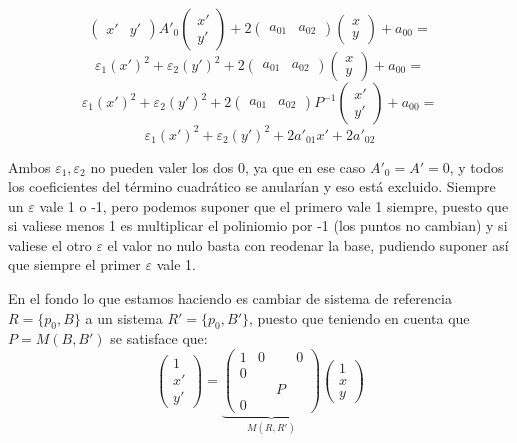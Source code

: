 \documentclass[10pt,a4paper,openright]{book}
\theoremstyle{break}
\begin{document}
$$\begin{pmatrix}
x' & y'
\end{pmatrix} A'_0 \begin{pmatrix}
x' \\ y'
\end{pmatrix} + 2 \begin{pmatrix}
a_{01} & a_{02} \end{pmatrix} \begin{pmatrix}
x \\ y
\end{pmatrix} + a_{00} =$$
$$\varepsilon_1 (x')^2 + \varepsilon_2 (y')^2 + 2 \begin{pmatrix}
a_{01} & a_{02} \end{pmatrix} \begin{pmatrix}
x \\ y
\end{pmatrix} + a_{00} =$$
$$ \varepsilon_1 (x')^2 + \varepsilon_2 (y')^2 + 2 \begin{pmatrix}
a_{01} & a_{02} \end{pmatrix} P^{-1} \begin{pmatrix}
x' \\ y'
\end{pmatrix} + a_{00} = $$
$$\varepsilon_1 (x')^2 + \varepsilon_2 (y')^2 + 2 a'_{01} x' + 2  a'_{02}$$

Ambos $\varepsilon_1 , \varepsilon_2$ no pueden valer los dos 0, ya que en ese caso $A'_0 = A'= 0$, y todos los coeficientes del término cuadrático se anularían y eso está excluido. Siempre un $\varepsilon$ vale 1 o -1, pero podemos suponer que el primero vale 1 siempre, puesto que si valiese menos 1 es multiplicar el poliniomio por -1 (los puntos no cambian) y si valiese el otro $\varepsilon$ el valor no nulo basta con reodenar la base, pudiendo suponer así que siempre el primer $\varepsilon$ vale 1.

En el fondo lo que estamos haciendo es cambiar de sistema de referencia $R=\{p_0, B\}$ a un sistema $R'=\{p_0, B'\}$, puesto que teniendo en cuenta que $P = M(B,B')$ se satisface que:
$$\begin{pmatrix} 1 \\ x' \\ y'\end{pmatrix} = \underbrace{\left(\begin{array}{c|ccc} 1 & 0 &  & 0 \\ \hline 0 &  &  &  \\  &  & P &  \\ 0 &  & & 
\end{array}\right)}_{M(R,R')} \begin{pmatrix} 1 \\ x \\ y \end{pmatrix}$$
\end{document}
